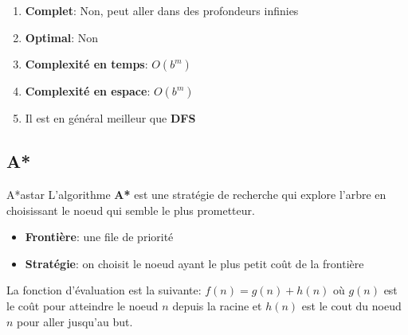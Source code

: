 \begin{remarks}\leavevmode
    \begin{enumerate}
        \item \textbf{Complet}: Non, peut aller dans des profondeurs infinies
        \item \textbf{Optimal}: Non
        \item \textbf{Complexité en temps}: $O(b^m)$
        \item \textbf{Complexité en espace}: $O(b^m)$
        \item Il est en général meilleur que \textbf{DFS}
    \end{enumerate}
\end{remarks}


\subsection{A*} %
\label{sub:a_}

\begin{definition}{A*}{astar}
    L'algorithme \textbf{A*} est une stratégie de recherche qui explore l'arbre en choisissant le noeud qui semble le plus prometteur.
    \begin{itemize}
        \item \textbf{Frontière}: une file de priorité
        \item \textbf{Stratégie}: on choisit le noeud ayant le plus petit coût de la frontière
    \end{itemize} 
    La fonction d'évaluation est la suivante: 
    \begin{math}
        f(n) = g(n) + h(n)
    \end{math} 
    où $g(n)$ est le coût pour atteindre le noeud $n$ depuis la racine et 
    $h(n)$ est le cout du noeud $n$ pour aller jusqu'au but.
\end{definition}

